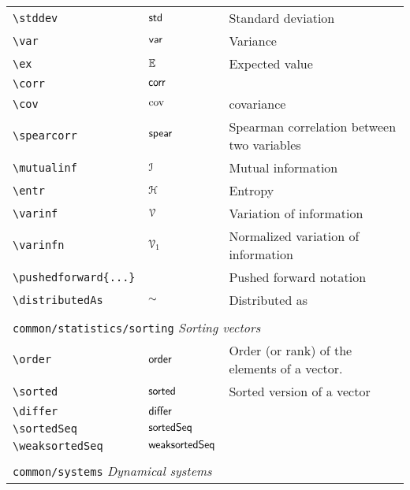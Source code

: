 \begin{longtable}{lll}
 \hline
{\color[rgb]{0.5,0.5,0.5}\texttt{\textbackslash stddev}} & $\mathsf{std}$ &  Standard deviation\\ 
 {\color[rgb]{0.5,0.5,0.5}\texttt{\textbackslash var}} & $\mathsf{var}$ &  Variance\\ 
 {\color[rgb]{0.5,0.5,0.5}\texttt{\textbackslash ex}} & $\mathbb{E}$ &  Expected value\\ 
 {\color[rgb]{0.5,0.5,0.5}\texttt{\textbackslash corr}} & $\mathsf{corr}$ & \\ 
 {\color[rgb]{0.5,0.5,0.5}\texttt{\textbackslash cov}} & $\mathrm{cov}$ &  covariance\\ 
 {\color[rgb]{0.5,0.5,0.5}\texttt{\textbackslash spearcorr}} & $\mathsf{spear}$ &  Spearman correlation between two variables\\ 
 {\color[rgb]{0.5,0.5,0.5}\texttt{\textbackslash mutualinf}} & $\mathcal{I}$ &  Mutual information\\ 
 {\color[rgb]{0.5,0.5,0.5}\texttt{\textbackslash entr}} & $\mathcal{H}$ &  Entropy\\ 
 {\color[rgb]{0.5,0.5,0.5}\texttt{\textbackslash varinf}} & $\mathcal{V}$ &  Variation of information\\ 
 {\color[rgb]{0.5,0.5,0.5}\texttt{\textbackslash varinfn}} & $\mathcal{V}_{1}$ &  Normalized variation of information\\ 
 {\color[rgb]{0.5,0.5,0.5}\texttt{\textbackslash pushedforward\{...\}}} &  &  Pushed forward notation\\ 
 {\color[rgb]{0.5,0.5,0.5}\texttt{\textbackslash distributedAs}} & $\sim$ &  Distributed as\\ 
  &  & \\ 
 \multicolumn{3}{l}{{\color[rgb]{0.5,0.5,0.5}\texttt{common/statistics/sorting}} \emph{Sorting vectors}}\\ 
 \hline
{\color[rgb]{0.5,0.5,0.5}\texttt{\textbackslash order}} & $\mathsf{order}$ &  Order (or rank) of the elements of a vector.\\ 
 {\color[rgb]{0.5,0.5,0.5}\texttt{\textbackslash sorted}} & $\mathsf{sorted}$ &  Sorted version of a vector\\ 
 {\color[rgb]{0.5,0.5,0.5}\texttt{\textbackslash differ}} & $\mathsf{differ}$ & \\ 
 {\color[rgb]{0.5,0.5,0.5}\texttt{\textbackslash sortedSeq}} & $\mathsf{sortedSeq}$ & \\ 
 {\color[rgb]{0.5,0.5,0.5}\texttt{\textbackslash weaksortedSeq}} & $\mathsf{weaksortedSeq}$ & \\ 
  &  & \\ 
 \multicolumn{3}{l}{{\color[rgb]{0.5,0.5,0.5}\texttt{common/systems}} \emph{Dynamical systems}}\\ 

\end{longtable}
